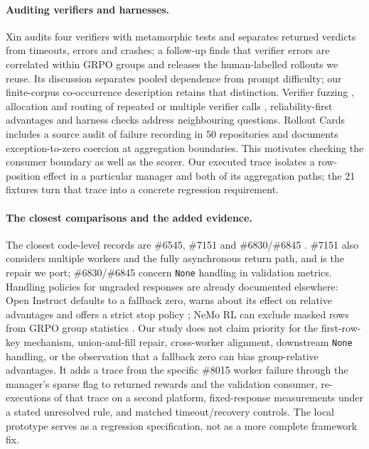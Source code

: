 \documentclass[10pt,a4paper]{article}
\let\cite\citep
\begin{document}
\paragraph{Auditing verifiers and harnesses.}
Xin \cite{xin2026wherefails} audits four verifiers with metamorphic tests and
separates returned verdicts from timeouts, errors and crashes; a follow-up
\cite{xin2026groupcorr} finds that verifier errors are correlated within GRPO
groups and releases the human-labelled rollouts we reuse. Its discussion
separates pooled dependence from prompt difficulty; our finite-corpus
co-occurrence description retains that distinction. Verifier fuzzing \cite{ray2026fuzzing}, allocation and routing of repeated
or multiple verifier calls \cite{hu2026vstress,hu2026routeaudit},
reliability-first advantages \cite{tian2026stargrpo} and harness checks
\cite{pan2026probe} address neighbouring questions. Rollout Cards
\cite{masters2026rolloutcards} includes a source audit of failure recording
in 50 repositories and documents exception-to-zero coercion at aggregation
boundaries. This motivates checking the consumer boundary as well as the
scorer. Our executed trace isolates a row-position effect in a particular
manager and both of its aggregation paths; the 21 fixtures turn that trace
into a concrete regression requirement.

\paragraph{The closest comparisons and the added evidence.}
The closest code-level records are \#6545, \#7151 and \#6830/\#6845
\cite{verl6545,verl7151,verl6830,verl6845}. \#7151 also considers multiple
workers and the fully asynchronous return path, and is the repair we port;
\#6830/\#6845 concern \texttt{None} handling in validation metrics. Handling
policies for ungraded responses are already documented elsewhere: Open
Instruct defaults to a fallback zero, warns about its effect on relative
advantages and offers a strict stop policy \cite{openinstruct2026failure};
NeMo RL can exclude masked rows from GRPO group statistics
\cite{nemorl2026masked}. Our study does not claim priority for the
first-row-key mechanism, union-and-fill repair, cross-worker alignment,
downstream \texttt{None} handling, or the observation that a fallback zero
can bias group-relative advantages. It adds a trace from the specific \#8015
worker failure through the manager's sparse flag to returned rewards and the
validation consumer, re-executions of that trace on a second platform,
fixed-response measurements under a stated unresolved rule, and matched
timeout/recovery controls. The local prototype serves as a regression
specification, not as a more complete framework fix.
\end{document}
